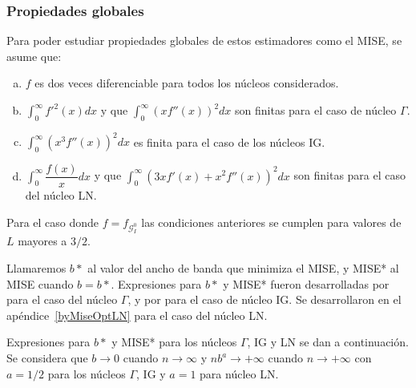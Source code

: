 \subsubsection{Propiedades globales}
\label{PropiedadesGlobales}

Para poder estudiar propiedades globales de estos estimadores como el MISE, se asume que:
\begin{enumerate}[a)]
	\label{CondPropGlobales}
	\item $f$ es dos veces diferenciable para todos los núcleos considerados.
	\item $\displaystyle{\int_0^{\infty}}  f'^2(x) dx$ y que $\displaystyle{\int_0^{\infty}}  (x f''(x))^2 dx$ son finitas para el caso de núcleo $\Gamma$.
	\item $\displaystyle{\int_0^{\infty}}  (x^3 f''(x))^2 dx$ es finita para el caso de los núcleos IG.
	\item $\displaystyle{\int_0^{\infty}}  \dfrac{f(x)}{x} dx$ y que $\displaystyle{\int_0^{\infty}}  (3 x f'(x)+x^2 f''(x))^2 dx$ son finitas para el caso del núcleo LN.
\end{enumerate}
Para el caso donde $f=f_{\mathcal{G}_I^0}$ las condiciones anteriores se cumplen para valores de $L$ mayores a $3/2$.

Llamaremos $b*$ al valor del ancho de banda que minimiza el MISE, y MISE* al MISE cuando $b=b*$. Expresiones para $b*$ y MISE* fueron desarrolladas por \citet{chensx2000} para el caso del núcleo $\Gamma$, y por \citet{Scaillet2004} para el caso de núcleo IG.
Se desarrollaron en el apéndice~\ref{byMiseOptLN} para el caso del núcleo LN. 

Expresiones para $b*$ y MISE* para los núcleos $\Gamma$, IG y LN  se dan a continuación. Se considera que $b \to 0$ cuando $n \to \infty$ y $n b^a \to +\infty$ cuando $n \to +\infty$ con $a=1/2$ para los núcleos $\Gamma$, IG y $a=1$ para núcleo LN.

